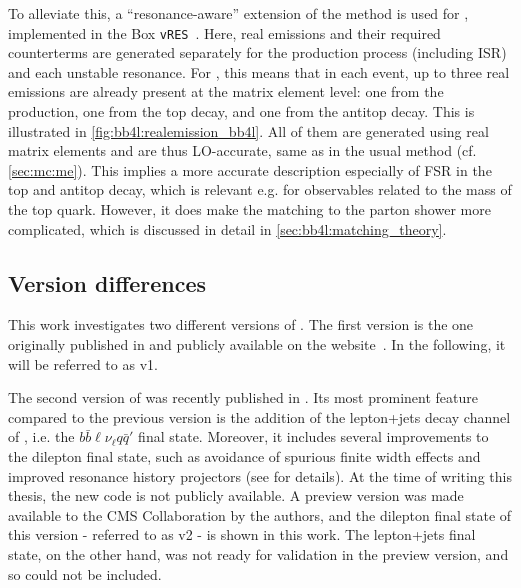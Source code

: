 To alleviate this, a ``resonance-aware'' extension of the \powheg method is used for \bbfourl, implemented in the \powheg Box \texttt{vRES}~\cite{Jezo:2015aia}. Here, real emissions and their required counterterms are generated separately for the production process (including ISR) and each unstable resonance. For \bbfourl, this means that in each event, up to three real emissions are already present at the matrix element level: one from the production, one from the top decay, and one from the antitop decay. This is illustrated in \cref{fig:bb4l:realemission_bb4l}. All of them are generated using real matrix elements and are thus LO-accurate, same as in the usual \powheg method (cf. \cref{sec:mc:me}). This implies a more accurate description especially of FSR in the top and antitop decay, which is relevant e.g. for observables related to the mass of the top quark. However, it does make the matching to the parton shower more complicated, which is discussed in detail in \cref{sec:bb4l:matching_theory}.


\subsection{Version differences}

This work investigates two different versions of \bbfourl. The first version is the one originally published in  and publicly available on the \powheg website~\cite{Powheg:website}. In the following, it will be referred to as \bbfourl v1.

The second version of \bbfourl was recently published in . Its most prominent feature compared to the previous version is the addition of the lepton+jets decay channel of \ttbar, i.e. the $b \bar{b} \ell \nu_{\ell} q \bar{q}'$ final state. Moreover, it includes several improvements to the dilepton final state, such as avoidance of spurious finite width effects and improved resonance history projectors (see  for details). At the time of writing this thesis, the new code is not publicly available. A preview version was made available to the CMS Collaboration by the authors, and the dilepton final state of this version - referred to as \bbfourl v2 - is shown in this work. The lepton+jets final state, on the other hand, was not ready for validation in the preview version, and so could not be included.


